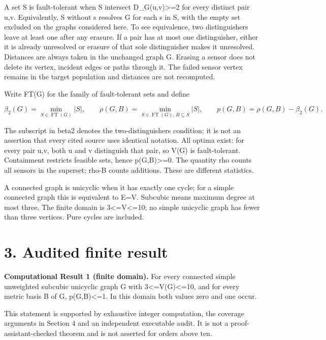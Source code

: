 \documentclass[
]{article}
\begin{document}
A set S is fault-tolerant when \textbar S intersect
D\_G(u,v)\textbar\textgreater=2 for every distinct pair u,v.
Equivalently, S without s resolves G for each s in S, with the empty set
excluded on the graphs considered here. To see equivalence, two
distinguishers leave at least one after any erasure. If a pair has at
most one distinguisher, either it is already unresolved or erasure of
that sole distinguisher makes it unresolved. Distances are always taken
in the unchanged graph G. Erasing a sensor does not delete its vertex,
incident edges or paths through it. The failed sensor vertex remains in
the target population and distances are not recomputed.

Write FT(G) for the family of fault-tolerant sets and define

\[\beta_2(G)=\min_{S\in\operatorname{FT}(G)}|S|,\qquad
\rho(G,B)=\min_{S\in\operatorname{FT}(G),\,B\subseteq S}|S|,
\qquad p(G,B)=\rho(G,B)-\beta_2(G).\]

The subscript in beta2 denotes the two-distinguishers condition; it is
not an assertion that every cited source uses identical notation. All
optima exist: for every pair u,v, both u and v distinguish that pair, so
V(G) is fault-tolerant. Containment restricts feasible sets, hence
p(G,B)\textgreater=0. The quantity rho counts all sensors in the
superset; rho-\textbar B\textbar{} counts additions. These are different
statistics.

A connected graph is unicyclic when it has exactly one cycle; for a
simple connected graph this is equivalent to
\textbar E\textbar=\textbar V\textbar. Subcubic means maximum degree at
most three. The finite domain is
3\textless=\textbar V\textbar\textless=10; no simple unicyclic graph has
fewer than three vertices. Pure cycles are included.

\section{3. Audited finite result}\label{audited-finite-result}

\textbf{Computational Result 1 (finite domain).} For every connected
simple unweighted subcubic unicyclic graph G with
3\textless=\textbar V(G)\textbar\textless=10, and for every metric basis
B of G, p(G,B)\textless=1. In this domain both values zero and one
occur.

This statement is supported by exhaustive integer computation, the
coverage arguments in Section 4 and an independent executable audit. It
is not a proof-assistant-checked theorem and is not asserted for orders
above ten.
\end{document}
